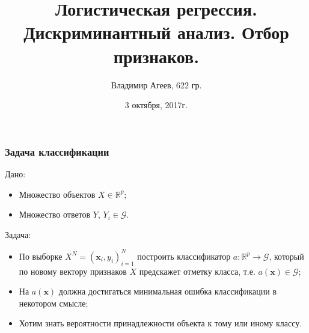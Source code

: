 \documentclass{beamer}
\title[LR и DA] %
{Логистическая регрессия. Дискриминантный анализ. Отбор признаков.}
\author[Агеев~В.А, 622 гр.] %
{Владимир Агеев, 622 гр.}
\date{3 октября, 2017г.}
\begin{document}
\frame[plain]{\titlepage}
  \begin{frame}
    \frametitle{Задача классификации}
    Дано:
    \begin{itemize}
      \item Множество объектов $X \in \mathbb{R}^p$;
      \item Множество ответов $Y$, $Y_i \in \mathcal{G}$.
    \end{itemize}

\bigskip

    Задача:
    \begin{itemize}
      \item По выборке $X^N = (\mathbf{x}_i, y_i)_{i = 1}^N$ построить классификатор $a: \mathbb{R}^p \rightarrow \mathcal{G}$, который по новому вектору признаков $X$ предскажет отметку класса, т.е. $a(\mathbf{x}) \in \mathcal{G}$;
      \item На $a(\mathbf{x})$ должна достигаться минимальная ошибка классификации в некотором смысле;
      \item Хотим знать вероятности принадлежности объекта к тому или иному классу.
    \end{itemize}
  \end{frame}
\end{document}
